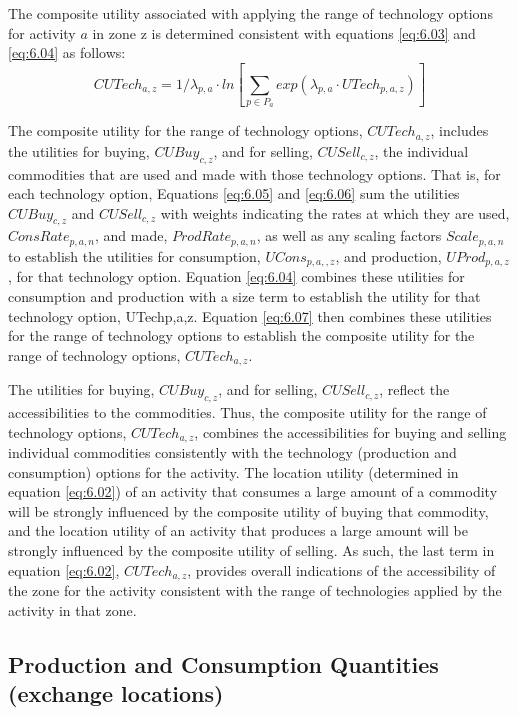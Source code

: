 The composite utility associated with applying the range of technology options for activity $a$ in zone z is determined consistent with equations \ref{eq:6.03} and \ref{eq:6.04} as follows:
\begin{equation}\label{eq:6.07}
CUTech_{a,z} = 1/\lambda_{p,a} \cdot ln \left[ \sum_{p \in P_a} exp(\lambda_{p,a} \cdot UTech_{p,a,z}) \right]
\end{equation}

The composite utility for the range of technology options, $CUTech_{a,z}$, includes the utilities for buying, $CUBuy_{c,z}$, and for selling, $CUSell_{c,z}$, the individual commodities that are used and made with those technology options. That is, for each technology option, Equations \ref{eq:6.05} and \ref{eq:6.06} sum the utilities $CUBuy_{c,z}$ and $CUSell_{c,z}$ with weights indicating the rates at which they are used, $ConsRate_{p,a,n}$, and made, $ProdRate_{p,a,n}$, as well as any scaling factors $Scale_{p,a,n}$ to establish the utilities for consumption, $UCons_{p,a,,z}$, and production, $UProd_{p,a,z}$, for that technology option. Equation \ref{eq:6.04} combines these utilities for consumption and production with a size term to establish the utility for that technology option, UTechp,a,z. Equation \ref{eq:6.07} then combines these utilities for the range of technology options to establish the composite utility for the range of technology options, $CUTech_{a,z}$.

The utilities for buying, $CUBuy_{c,z}$, and for selling, $CUSell_{c,z}$, reflect the accessibilities to the commodities.  Thus, the composite utility for the range of technology options, $CUTech_{a,z}$, combines the accessibilities for buying and selling individual commodities consistently with the technology (production and consumption) options for the activity. The location utility (determined in equation \ref{eq:6.02}) of an activity that consumes a large amount of a commodity will be strongly influenced by the composite utility of buying that commodity, and the location utility of an activity that produces a large amount will be strongly influenced by the composite utility of selling. As such, the last term in equation \ref{eq:6.02}, $CUTech_{a,z}$, provides overall indications of the accessibility of the zone for the activity consistent with the range of technologies applied by the activity in that zone.

\subsection{Production and Consumption Quantities (exchange locations)}\label{sec:aa-production-consumption-locations}

